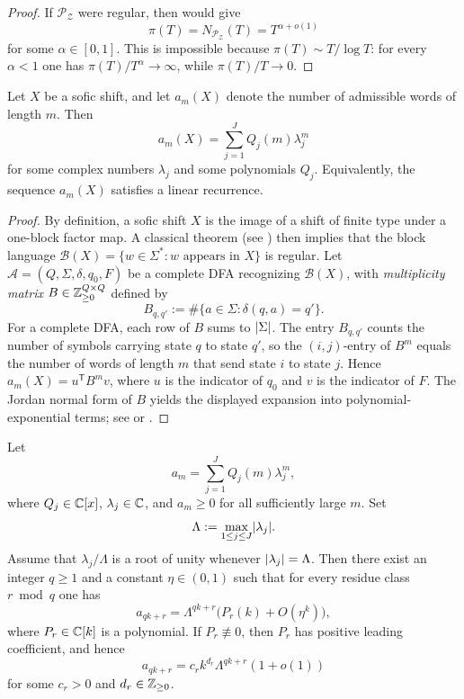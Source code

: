 \begin{proof}
  If \(\mathcal P_{\mathcal Z}\) were regular, then
   would give
  \[
    \pi(T)=N_{\mathcal P_{\mathcal Z}}(T)=T^{\alpha+o(1)}
  \]
  for some \(\alpha\in[0,1]\). This is impossible because
  \(\pi(T)\sim T/\log T\): for every \(\alpha<1\) one has
  \(\pi(T)/T^\alpha\to\infty\), while \(\pi(T)/T\to 0\).
\end{proof}

\begin{proposition}
  \label{prop:sofic-counts-exponential-polynomial}
  Let \(X\) be a sofic shift, and let \(a_m(X)\) denote the number of
  admissible words of length \(m\). Then
  \[
    a_m(X)=\sum_{j=1}^J Q_j(m)\lambda_j^m
  \]
  for some complex numbers \(\lambda_j\) and some polynomials \(Q_j\).
  Equivalently, the sequence \(a_m(X)\) satisfies a linear recurrence.
\end{proposition}

\begin{proof}
  By definition, a sofic shift \(X\) is the image of a shift of finite
  type under a one-block factor map. A classical theorem (see
  \cite[Theorem~3.2.1]{LindMarcus1995}) then implies that the block
  language \(\mathcal B(X)=\{w\in\Sigma^\ast:w\text{ appears in }X\}\)
  is regular. Let \(\mathcal A=(Q,\Sigma,\delta,q_0,F)\) be a complete
  DFA recognizing \(\mathcal B(X)\), with \emph{multiplicity matrix}
  \(B\in\mathbb{Z}_{\ge 0}^{Q\times Q}\) defined by
  \[
    B_{q,q'}:=\#\{a\in\Sigma:\delta(q,a)=q'\}.
  \]
  For a complete DFA, each row of \(B\) sums to \(\lvert \Sigma \rvert\). The
  entry \(B_{q,q'}\) counts the number of symbols carrying state \(q\)
  to state \(q'\), so the \((i,j)\)-entry of \(B^m\) equals the number
  of words of length \(m\) that send state \(i\) to state \(j\). Hence
  \(a_m(X)=u^{\mathsf T}B^m v\), where \(u\) is the indicator of
  \(q_0\) and \(v\) is the indicator of \(F\). The Jordan normal form
  of \(B\) yields the displayed expansion into polynomial-exponential
  terms; see \cite[Theorem~III.4.1]{BerstelReutenauer2011} or
  \cite[Chapter~V]{FlajoletSedgewick2009}.
\end{proof}

\begin{lemma}
  \label{lem:residue-class-asymptotics}
  Let
  \[
    a_m=\sum_{j=1}^J Q_j(m)\lambda_j^m,
  \]
  where \(Q_j\in\mathbb{C}[x]\), \(\lambda_j\in\mathbb{C}\), and \(a_m\ge 0\) for all
  sufficiently large \(m\). Set
  \[
    \Lambda:=\max_{1\le j\le J}\lvert \lambda_j \rvert.
  \]
  Assume that \(\lambda_j/\Lambda\) is a root of unity whenever
  \(\lvert \lambda_j \rvert=\Lambda\). Then there exist an integer \(q\ge 1\)
  and a constant \(\eta\in(0,1)\) such that for every residue class
  \(r\bmod q\) one has
  \[
    a_{qk+r}
    =\Lambda^{qk+r}\bigl(P_r(k)+O(\eta^k)\bigr),
  \]
  where \(P_r\in\mathbb{C}[k]\) is a polynomial. If \(P_r\not\equiv 0\), then
  \(P_r\) has positive leading coefficient, and hence
  \[
    a_{qk+r}
    =c_r k^{d_r}\Lambda^{qk+r}(1+o(1))
  \]
  for some \(c_r>0\) and \(d_r\in\mathbb{Z}_{\ge 0}\).
\end{lemma}

